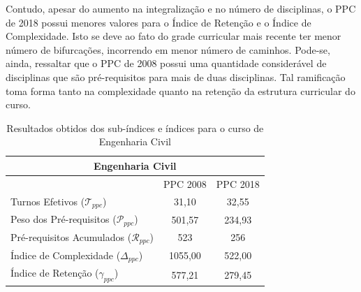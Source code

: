 \documentclass[a4paper, 12pt]{article}
\begin{document}
Contudo, apesar do aumento na integralização e no número de disciplinas, o PPC de 2018 possui menores valores para o Índice de Retenção e o Índice de 
Complexidade. Isto se deve ao fato do grade curricular mais recente ter menor número de bifurcações, incorrendo em menor número de caminhos. Pode-se, ainda, 
ressaltar que o PPC de 2008 possui uma quantidade considerável de disciplinas que são pré-requisitos para mais de duas disciplinas. Tal ramificação toma 
forma tanto na complexidade quanto na retenção da estrutura curricular do curso. \\

\begin{center}
\begin{table}
\centering
\begin{tabular}{|l|c|c|}
\hline
\multicolumn{3}{|c|}{Engenharia Civil} \\ 
\hline\hline
	& PPC 2008 & PPC 2018 \\
\hline
Turnos Efetivos ($\mathcal{T}_{ppc}$) & 31,10 & 32,55 \\
\hline
Peso dos Pré-requisitos ($\mathcal{P}_{ppc}$) & 501,57 & 234,93 \\
\hline
Pré-requisitos Acumulados ($\mathcal{R}_{ppc}$) & 523 & 256 \\
\hline
Índice de Complexidade ($\Delta_{ppc}$) & 1055,00 & 522,00 \\
\hline
Índice de Retenção ($\gamma_{ppc}$) & 577,21 & 279,45 \\ 
\hline
\end{tabular}
\caption{Resultados obtidos dos sub-índices e índices para o curso de Engenharia Civil}
\end{table}
\end{center}
\end{document}
